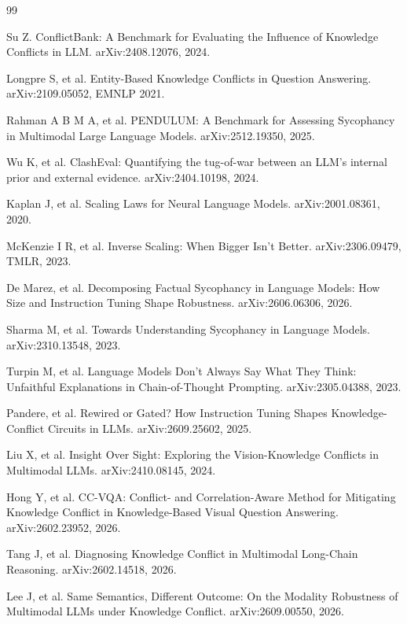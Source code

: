 \documentclass[10.5pt,compsoc,UTF8]{CjC}
\theoremstyle{mystyle}
\begin{document}
\begin{thebibliography}{99}
\setlength{\itemsep}{0.2em}

Su Z. ConflictBank: A Benchmark for Evaluating the Influence of Knowledge Conflicts in LLM. arXiv:2408.12076, 2024.

Longpre S, et al. Entity-Based Knowledge Conflicts in Question Answering. arXiv:2109.05052, EMNLP 2021.

Rahman A B M A, et al. PENDULUM: A Benchmark for Assessing Sycophancy in Multimodal Large Language Models. arXiv:2512.19350, 2025.

Wu K, et al. ClashEval: Quantifying the tug-of-war between an LLM's internal prior and external evidence. arXiv:2404.10198, 2024.

Kaplan J, et al. Scaling Laws for Neural Language Models. arXiv:2001.08361, 2020.

McKenzie I R, et al. Inverse Scaling: When Bigger Isn't Better. arXiv:2306.09479, TMLR, 2023.

De Marez, et al. Decomposing Factual Sycophancy in Language Models: How Size and Instruction Tuning Shape Robustness. arXiv:2606.06306, 2026.

Sharma M, et al. Towards Understanding Sycophancy in Language Models. arXiv:2310.13548, 2023.

Turpin M, et al. Language Models Don't Always Say What They Think: Unfaithful Explanations in Chain-of-Thought Prompting. arXiv:2305.04388, 2023.

Pandere, et al. Rewired or Gated? How Instruction Tuning Shapes Knowledge-Conflict Circuits in LLMs. arXiv:2609.25602, 2025.

Liu X, et al. Insight Over Sight: Exploring the Vision-Knowledge Conflicts in Multimodal LLMs. arXiv:2410.08145, 2024.

Hong Y, et al. CC-VQA: Conflict- and Correlation-Aware Method for Mitigating Knowledge Conflict in Knowledge-Based Visual Question Answering. arXiv:2602.23952, 2026.

Tang J, et al. Diagnosing Knowledge Conflict in Multimodal Long-Chain Reasoning. arXiv:2602.14518, 2026.

Lee J, et al. Same Semantics, Different Outcome: On the Modality Robustness of Multimodal LLMs under Knowledge Conflict. arXiv:2609.00550, 2026.


\end{thebibliography}
\end{document}
